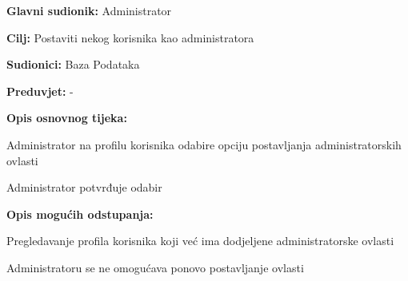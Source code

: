 				
					\noindent {}
					\begin{packed_item}
						
						\item \textbf{Glavni sudionik: }Administrator
						\item  \textbf{Cilj:} Postaviti nekog korisnika kao administratora 
						\item  \textbf{Sudionici:} Baza Podataka
						\item  \textbf{Preduvjet:} -
						\item  \textbf{Opis osnovnog tijeka:}
						
						\item[] \begin{packed_enum}
							
							\item Administrator na profilu korisnika odabire opciju postavljanja administratorskih ovlasti
							\item Administrator potvrđuje odabir
							
						\end{packed_enum}
						
						\item  \textbf{Opis mogućih odstupanja:}
						
						\item[] \begin{packed_item}
							
							\item[1.a] Pregledavanje profila korisnika koji već ima dodjeljene administratorske ovlasti
							\item[] \begin{packed_enum}
								
								\item Administratoru se ne omogućava ponovo postavljanje ovlasti
								
							\end{packed_enum}
							
						\end{packed_item}
					\end{packed_item}
				
